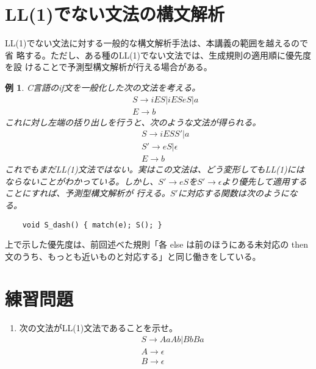 \documentclass[a4j,10pt]{jsarticle}
\newtheorem{example}{例}
\begin{document}
\section{LL(1)でない文法の構文解析}

LL(1)でない文法に対する一般的な構文解析手法は、本講義の範囲を越えるので省
略する。ただし、ある種のLL(1)でない文法では、生成規則の適用順に優先度を設
けることで予測型構文解析が行える場合がある。

\begin{screen}
 \begin{example}
  C言語のif文を一般化した次の文法を考える。
  \begin{eqnarray*}
   & & S \rightarrow iES | iESeS | a \\
   & & E \rightarrow b
  \end{eqnarray*}
  これに対し左端の括り出しを行うと、次のような文法が得られる。
  \begin{eqnarray*}
   & & S \rightarrow iESS' | a \\
   & & S' \rightarrow eS | \epsilon \\
   & & E \rightarrow b
  \end{eqnarray*}
  これでもまだLL(1)文法ではない。実はこの文法は、どう変形してもLL(1)には
  ならないことがわかっている。しかし、$S' \rightarrow eS$を$S'
  \rightarrow \epsilon$より優先して適用することにすれば、予測型構文解析が
  行える。$S'$に対応する関数は次のようになる。
  \begin{verbatim}
	void S_dash() { match(e); S(); }\end{verbatim}
 \end{example}
 上で示した優先度は、前回述べた規則「各 else は前のほうにある未対応の
 then 文のうち、もっとも近いものと対応する」と同じ働きをしている。
\end{screen}

\section*{練習問題}

\begin{enumerate}
 \item 次の文法がLL(1)文法であることを示せ。
       \begin{eqnarray*}
	& & S \rightarrow AaAb | BbBa \\
	& & A \rightarrow \epsilon \\
	& & B \rightarrow \epsilon
       \end{eqnarray*}
\end{enumerate}
\end{document}
